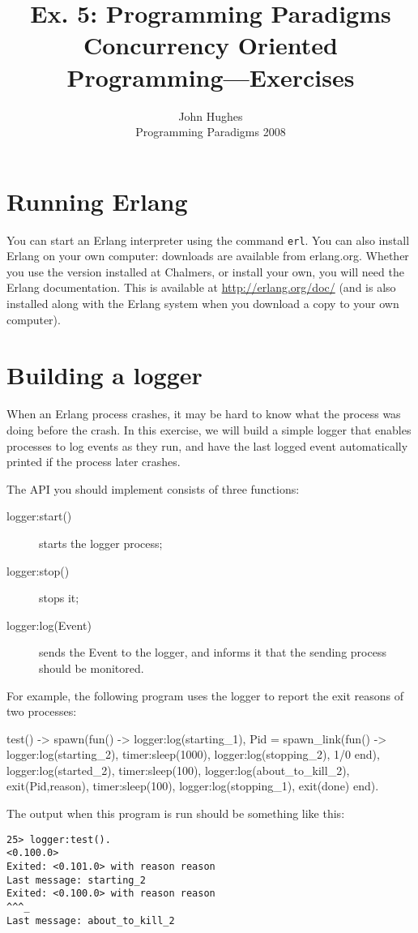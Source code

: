 \documentclass{article}
\newcommand{\courseinfo}{ John Hughes \\ Programming Paradigms 2008 }
\begin{document}
\title{Ex. 5: Programming Paradigms 
\\
Concurrency Oriented Programming—Exercises}
\author{\courseinfo}
\date{}
\maketitle

\section{Running Erlang}

You can start an Erlang interpreter using the command \verb!erl!. You
can also install Erlang on your own computer: downloads are available
from erlang.org. Whether you use the version installed at Chalmers, or
install your own, you will need the Erlang documentation. This is
available at \url{http://erlang.org/doc/} (and is also installed along
with the Erlang system when you download a copy to your own computer).


\section{Building a logger}

When an Erlang process crashes, it may be hard to know what the
process was doing before the crash. In this exercise, we will build a
simple logger that enables processes to log events as they run, and
have the last logged event automatically printed if the process later
crashes.

The API you should implement consists of three functions:

\begin{description}
\item[\textsf{logger:start()}]  starts the logger process;
\item[\textsf{logger:stop()}]   stops it;
\item[\textsf{logger:log(Event)}] sends the \textsf{Event} to the logger, and
  informs it that the sending process should be monitored.
\end{description}

For example, the following program uses the logger to report the exit reasons of two processes:
\begin{erlang}
test() ->
    spawn(fun() ->
	  logger:log(starting_1),
	  Pid = spawn_link(fun() ->
			   logger:log(starting_2),
			   timer:sleep(1000),
			   logger:log(stopping_2),
			   1/0
		   end),
	  logger:log(started_2),
	  timer:sleep(100),
	  logger:log(about_to_kill_2),
	  exit(Pid,reason),
	  timer:sleep(100),
	  logger:log(stopping_1),
	  exit(done)
	end).
\end{erlang}
The output when this program is run should be something  like this:
\begin{verbatim}
25> logger:test().
<0.100.0>
Exited: <0.101.0> with reason reason
Last message: starting_2
Exited: <0.100.0> with reason reason
^^^_
Last message: about_to_kill_2
\end{verbatim}
\end{document}
